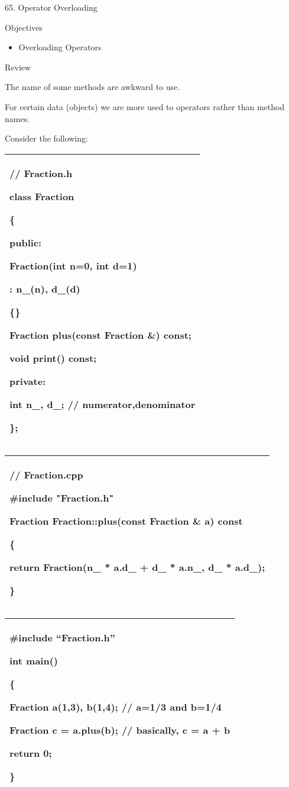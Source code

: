 \documentclass[
]{article}
\author{}
\date{}
\providecommand{\tightlist}{%
  \setlength{\itemsep}{0pt}\setlength{\parskip}{0pt}}
\begin{document}
65. Operator Overloading

Objectives

\begin{itemize}
\tightlist
\item
  Overloading Operators
\end{itemize}

Review

The name of some methods are awkward to use.

For certain data (objects) we are more used to operators rather than
method names.

Consider the following:

\begin{longtable}[]{@{}l@{}}
\toprule
\endhead
\begin{minipage}[t]{0.97\columnwidth}\raggedright
// Fraction.h

class Fraction

\{

public:

Fraction(int n=0, int d=1)

: n\_(n), d\_(d)

\{\}

Fraction plus(const Fraction \&) const;

void print() const;

private:

int n\_, d\_; // numerator,denominator

\};\strut
\end{minipage}\tabularnewline
\bottomrule
\end{longtable}

\begin{longtable}[]{@{}l@{}}
\toprule
\endhead
\begin{minipage}[t]{0.97\columnwidth}\raggedright
// Fraction.cpp

\#include "Fraction.h"

Fraction Fraction::plus(const Fraction \& a) const

\{

return Fraction(n\_ * a.d\_ + d\_ * a.n\_, d\_ * a.d\_);

\}\strut
\end{minipage}\tabularnewline
\bottomrule
\end{longtable}

\begin{longtable}[]{@{}l@{}}
\toprule
\endhead
\begin{minipage}[t]{0.97\columnwidth}\raggedright
\#include ``Fraction.h''

int main()

\{

Fraction a(1,3), b(1,4); // a=1/3 and b=1/4

Fraction c = a.plus(b); // basically, c = a + b

return 0;

\}\strut
\end{minipage}\tabularnewline
\bottomrule
\end{longtable}
\end{document}
